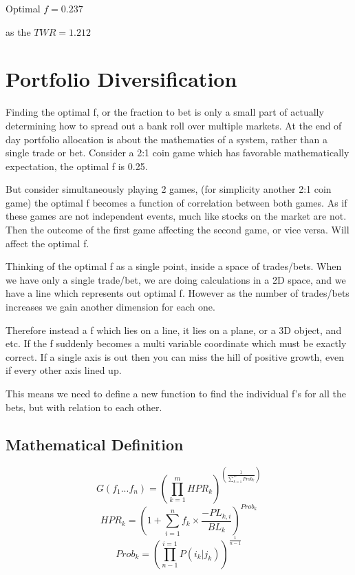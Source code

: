 \documentclass[12pt]{article}
\begin{document}
Optimal \(f = 0.237\)

as the \(TWR = 1.212\)

\section{Portfolio Diversification}

Finding the optimal f, or the fraction to bet is only a small part of actually determining 
how to spread out a bank roll over multiple markets. At the end of day portfolio allocation 
is about the mathematics of a system, rather than a single trade or bet. Consider a 2:1 coin 
game which has favorable mathematically expectation, the optimal f is 0.25.

But consider simultaneously playing 2 games, {(for simplicity another 2:1 coin game)} the 
optimal f becomes a function of correlation between both games. As if these games are not 
independent events, much like stocks on the market are not. Then the outcome of the first 
game affecting the second game, or vice versa. Will affect the optimal f.

Thinking of the optimal f as a single point, inside a space of trades/bets. When we have 
only a single trade/bet, we are doing calculations in a 2D space, and we have a line which 
represents out optimal f. However as the number of trades/bets increases we gain another 
dimension for each one.

Therefore instead a f which lies on a line, it lies on a plane, or a 3D object, and etc. If 
the f suddenly becomes a multi variable coordinate which must be exactly correct. If a 
single axis is out then you can miss the hill of positive growth, even if every other axis 
lined up.

This means we need to define a new function to find the individual f's for all the bets, but 
with relation to each other.

\subsection{Mathematical Definition}

\begin{equation}\label{eq:G}
    G(f_1...f_n) = \left( \displaystyle\prod^{m}_{k=1} HPR_k \right) ^{ \left( \displaystyle\frac{1}{\sum^{m}_{k=1}Prob_k} \right)}
\end{equation}
\begin{equation}\label{eq:HPR_k}
    HPR_k = \left( 1 +  \displaystyle\sum^{n}_{i=1} f_k \times \frac{- PL_{k,i}}{BL_k} \right) ^{Prob_k}
\end{equation}
\begin{equation}\label{eq:Prob_k}
    Prob_k = \left( \displaystyle\prod_{n - 1}^{i=1} P(i_k | j_k)\right)^{\frac{1}{n - 1}}
\end{equation}
\end{document}
